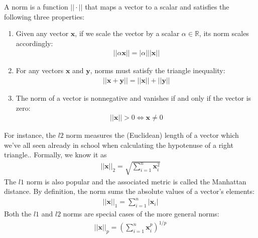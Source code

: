 \documentclass[a4paper,12pt]{article}
\theoremstyle{definition}
\newcommand{\R}{\mathbb{R}}
\begin{document}
    A norm is a function $||\cdot||$ that maps a vector to a scalar and satisfies the following three properties:
    \begin{enumerate}
        \item Given any vector $\mathbf{x}$, if we scale the vector by a scalar $\alpha \in \R$, its norm scales accordingly:
        \begin{equation*}
            \begin{aligned}
                ||\alpha\mathbf{x}|| = |\alpha|||\mathbf{x}||
            \end{aligned}
        \end{equation*}
        \item For any vectors $\mathbf{x}$ and $\mathbf{y}$, norms must satisfy the triangle inequality:
        \begin{equation*}
            \begin{aligned}
                ||\mathbf{x} + \mathbf{y}|| = ||\mathbf{x}|| + ||\mathbf{y}||
            \end{aligned}
        \end{equation*}
        \item The norm of a vector is nonnegative and vanishes if and only if the vector is zero: 
        \begin{equation*}
            \begin{aligned}
                ||\mathbf{x}|| > 0 \iff \mathbf{x} \neq 0
            \end{aligned}
        \end{equation*}
    \end{enumerate}
    For instance, the $l2$ norm measures the (Euclidean) length of a vector which we've all seen already in school when calculating the hypotenuse of a right triangle..
    Formally, we know it as
    \begin{equation*}
        \begin{aligned}
            ||\mathbf{x}||_2 = \sqrt{\sum_{i=1}^{n}\mathbf{x}_i^2}
        \end{aligned}
    \end{equation*}
    The $l1$ norm is also popular and the associated metric is called the Manhattan distance. By definition, the 
    norm sums the absolute values of a vector's elements:
    \begin{equation*}
        \begin{aligned}
            ||\mathbf{x}||_1 = \sum_{i=1}^{n}|\mathbf{x}_i|
        \end{aligned}
    \end{equation*}
    Both the $l1$ and $l2$ norms are special cases of the more general norms:
    \begin{equation}
        \begin{aligned}
            ||\mathbf{x}||_p = \left({\sum_{i=1}^{n}\mathbf{x}_i^p}\right)^{1/p}
        \end{aligned}
    \end{equation}
\end{document}
